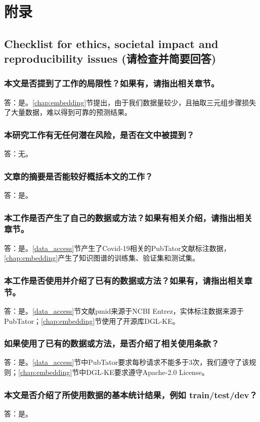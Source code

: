\documentclass[twocolumn]{article}
\begin{document}



\section{附录\label{chap:supp}}

\subsection{Checklist for ethics, societal impact and reproducibility issues (请检查并简要回答)}

\subsubsection{本文是否提到了工作的局限性？如果有，请指出相关章节。}
答：是。\ref{chap:embedding}节提出，由于我们数据量较少，且抽取三元组步骤损失了大量数据，难以得到可靠的预测结果。
\subsubsection{本研究工作有无任何潜在风险，是否在文中被提到？}
答：无。
\subsubsection{文章的摘要是否能较好概括本文的工作？}
答：是。
\subsubsection{本工作是否产生了自己的数据或方法？如果有相关介绍，请指出相关章节。}
答：是。\ref{data_access}节产生了Covid-19相关的PubTator文献标注数据，\ref{chap:embedding}产生了知识图谱的训练集、验证集和测试集。
\subsubsection{本工作是否使用并介绍了已有的数据或方法？如果有，请指出相关章节。}
答：是。\ref{data_access}节文献pmid来源于NCBI Entrez，实体标注数据来源于PubTator；\ref{chap:embedding}节使用了开源库DGL-KE。
\subsubsection{如果使用了已有的数据或方法，是否介绍了相关使用条款？}
答：是。\ref{data_access}节中PubTator要求每秒请求不能多于3次，我们遵守了该规则；\ref{chap:embedding}节中DGL-KE要求遵守Apache-2.0 License。
\subsubsection{本文是否介绍了所使用数据的基本统计结果，例如 train/test/dev？}
答：是。
\end{document}
